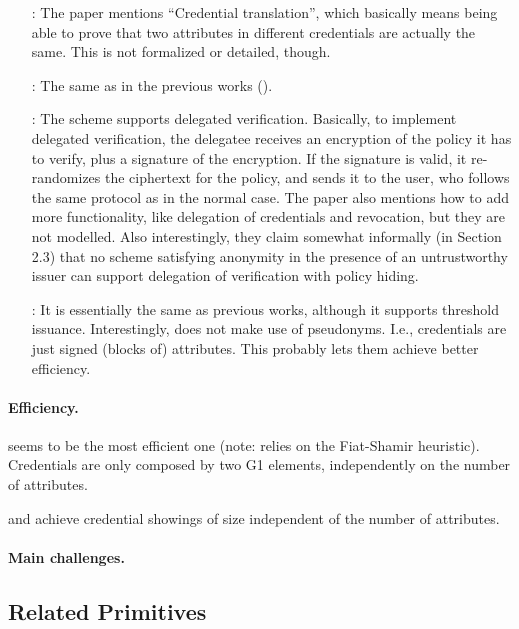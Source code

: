\begin{enumerate}
\item[\cite{cmz14}:] The paper mentions ``Credential translation'', which
  basically means being able to prove that two attributes in different
  credentials are actually the same. This is not formalized or detailed,
  though.
\item[\cite{cdhk15}:] The same as in the previous works (\cite{cl01,cl02,cl04}).
\item[\cite{dmm+18}:] The scheme supports delegated verification. Basically,
  to implement delegated verification, the delegatee receives an encryption of
  the policy it has to verify, plus a signature of the encryption. If the
  signature is valid, it re-randomizes the ciphertext for the policy, and
  sends it to the user, who follows the same protocol as in the normal case.
  The paper also mentions how to add more functionality, like delegation of
  credentials and revocation, but they are not modelled. Also interestingly,
  they claim somewhat informally (in Section 2.3) that no scheme satisfying
  anonymity in the presence of an untrustworthy issuer can support delegation
  of verification with policy hiding.
\item[\cite{sms+19}:] It is essentially the same as previous works, although it
  supports threshold issuance. Interestingly, \cite{sms+19} does not make use
  of pseudonyms. I.e., credentials are just signed (blocks of) attributes. This
  probably lets them achieve better efficiency. 
\end{enumerate}

\paragraph{Efficiency.}

\cite{sms+19} seems to be the most efficient one (note: relies on the
Fiat-Shamir heuristic). Credentials are only composed by two G1 elements,
independently on the number of attributes. 

\cite{cdhk15} and \cite{fhs19} achieve credential showings of size independent
of the number of attributes.

\paragraph{Main challenges.}

\subsection{Related Primitives}

